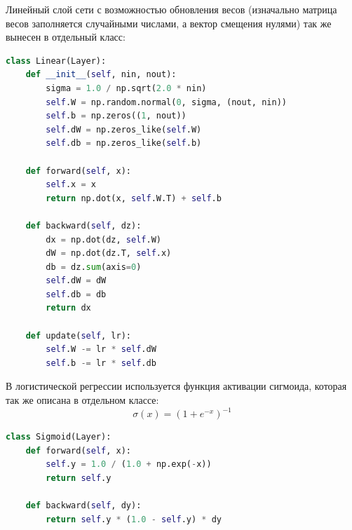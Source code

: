 Линейный слой сети с возможностью обновления весов (изначально матрица весов заполняется случайными числами, а вектор смещения нулями) так же вынесен в отдельный класс:
\begin{lstlisting}[language=Python]
class Linear(Layer):
    def __init__(self, nin, nout):
        sigma = 1.0 / np.sqrt(2.0 * nin)
        self.W = np.random.normal(0, sigma, (nout, nin))
        self.b = np.zeros((1, nout))
        self.dW = np.zeros_like(self.W)
        self.db = np.zeros_like(self.b)

    def forward(self, x):
        self.x = x
        return np.dot(x, self.W.T) + self.b

    def backward(self, dz):
        dx = np.dot(dz, self.W)
        dW = np.dot(dz.T, self.x)
        db = dz.sum(axis=0)
        self.dW = dW
        self.db = db
        return dx

    def update(self, lr):
        self.W -= lr * self.dW
        self.b -= lr * self.db
\end{lstlisting}
В логистической регрессии используется функция активации сигмоида, которая так же описана в отдельном классе:
$$\sigma(x) = (1 + e ^ {-x}) ^ {-1}$$
\begin{lstlisting}[language=Python]
class Sigmoid(Layer):
    def forward(self, x):
        self.y = 1.0 / (1.0 + np.exp(-x))
        return self.y

    def backward(self, dy):
        return self.y * (1.0 - self.y) * dy
\end{lstlisting}
\pagebreak

